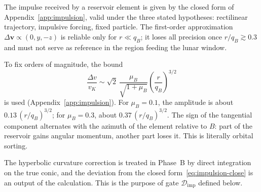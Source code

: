 \documentclass[11pt,a4paper,openany]{report}
\begin{document}
The impulse received by a reservoir element is given by the closed form of
Appendix~\ref{app:impulsion}, valid under the three stated hypotheses: rectilinear trajectory,
impulsive forcing, fixed particle. The first-order approximation
$\Delta\mathbf{v}\propto(0,y,-z)$ is reliable only for $r\ll q_B$; it loses all precision once
$r/q_B\gtrsim0.3$ and must not serve as reference in the region feeding the lunar window.

To fix orders of magnitude, the bound
\begin{equation}
\frac{\Delta v}{v_K}\sim\sqrt2\,\frac{\mu_B}{\sqrt{1+\mu_B}}
\left(\frac{r}{q_B}\right)^{3/2}
\label{eq:impulsion}
\end{equation}
is used (Appendix~\ref{app:impulsion}). For $\mu_B=0.1$, the amplitude is about
$0.13\,(r/q_B)^{3/2}$; for $\mu_B=0.3$, about $0.37\,(r/q_B)^{3/2}$. The sign of the tangential
component alternates with the azimuth of the element relative to $B$: part of the reservoir gains
angular momentum, another part loses it. This is literally orbital sorting.

The hyperbolic curvature correction is treated in Phase~B by direct integration on the true conic,
and the deviation from the closed form~\eqref{eq:impulsion-close} is an output of the calculation.
This is the purpose of gate $\mathcal{D}_{\mathrm{imp}}$ defined below.
\end{document}
